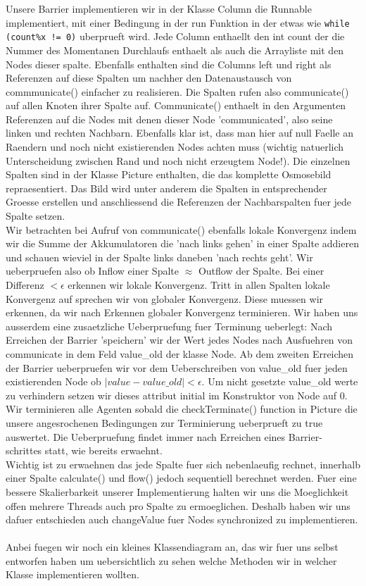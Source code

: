 \documentclass[12pt]{article}
\begin{document}
Unsere Barrier implementieren wir in der Klasse Column die Runnable implementiert, mit einer Bedingung in der run Funktion in der etwas wie \verb+while (count%x != 0)+ uberprueft wird. Jede Column enthaellt den int count der die Nummer des Momentanen Durchlaufs enthaelt als auch die Arrayliste mit den Nodes dieser spalte. Ebenfalls enthalten sind die Columns left und right als Referenzen auf diese Spalten um nachher den Datenaustausch von commmunicate() einfacher zu realisieren. Die Spalten rufen also communicate() auf allen Knoten ihrer Spalte auf. Communicate() enthaelt in den Argumenten Referenzen auf die Nodes mit denen dieser Node 'communicated', also seine linken und rechten Nachbarn. Ebenfalls klar ist, dass man hier auf null Faelle an Raendern und noch nicht existierenden Nodes achten muss (wichtig natuerlich Unterscheidung zwischen Rand und noch nicht erzeugtem Node!). Die einzelnen Spalten sind in der Klasse Picture enthalten, die das komplette Osmosebild repraesentiert. Das Bild wird unter anderem die Spalten in entsprechender Groesse erstellen und anschliessend die Referenzen der Nachbarspalten fuer jede Spalte setzen.\\
Wir betrachten bei Aufruf von communicate() ebenfalls lokale Konvergenz indem wir die Summe der Akkumulatoren die 'nach links gehen' in einer Spalte addieren und schauen wieviel in der Spalte links daneben 'nach rechts geht'. Wir ueberpruefen also ob Inflow einer Spalte $\approx$ Outflow der Spalte. Bei einer Differenz $< \epsilon$ erkennen wir lokale Konvergenz. Tritt in allen Spalten lokale Konvergenz auf sprechen wir von globaler Konvergenz. Diese muessen wir erkennen, da wir nach Erkennen globaler Konvergenz terminieren. Wir haben uns ausserdem eine zusaetzliche Ueberpruefung fuer Terminung ueberlegt: Nach Erreichen der Barrier 'speichern' wir der Wert jedes Nodes nach Ausfuehren von communicate in dem Feld value\_old der klasse Node. Ab dem zweiten Erreichen der Barrier ueberpruefen wir vor dem Ueberschreiben von value\_old fuer jeden existierenden Node ob $|value-value\_old| < \epsilon$. Um nicht gesetzte value\_old werte zu verhindern setzen wir dieses attribut initial im Konstruktor von Node auf 0.\\
Wir terminieren alle Agenten sobald die checkTerminate() function in Picture die unsere angesrochenen Bedingungen zur Terminierung ueberprueft zu true auswertet. Die Ueberpruefung findet immer nach Erreichen eines Barrier- schrittes statt, wie bereits erwaehnt.\\
Wichtig ist zu erwaehnen das jede Spalte fuer sich nebenlaeufig rechnet, innerhalb einer Spalte calculate() und flow() jedoch sequentiell berechnet werden. Fuer eine bessere Skalierbarkeit unserer Implementierung halten wir uns die Moeglichkeit offen mehrere Threads auch pro Spalte zu ermoeglichen. Deshalb haben wir uns dafuer entschieden auch changeValue fuer Nodes synchronized zu implementieren.\\\\


Anbei fuegen wir noch ein kleines Klassendiagram an, das wir fuer uns selbst entworfen haben um uebersichtlich zu sehen welche Methoden wir in welcher Klasse implementieren wollten.





\end{document}
